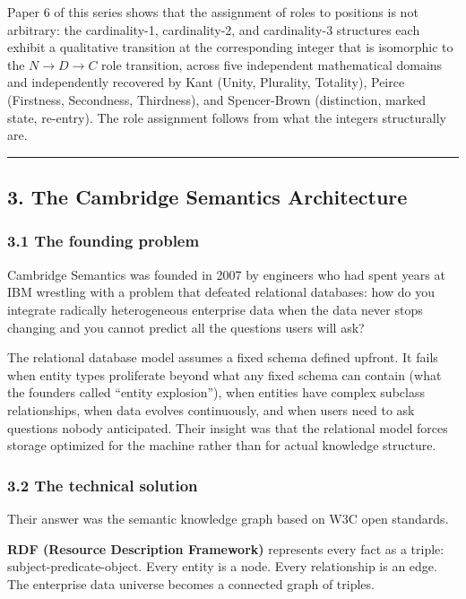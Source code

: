 \documentclass[
  11pt,
  letterpaper,
]{article}
\begin{document}
Paper 6 of this series shows that the assignment of roles to positions
is not arbitrary: the cardinality-1, cardinality-2, and cardinality-3
structures each exhibit a qualitative transition at the corresponding
integer that is isomorphic to the \(N \to D \to C\) role transition,
across five independent mathematical domains and independently recovered
by Kant (Unity, Plurality, Totality), Peirce (Firstness, Secondness,
Thirdness), and Spencer-Brown (distinction, marked state, re-entry). The
role assignment follows from what the integers structurally are.

\begin{center}\rule{0.5\linewidth}{0.5pt}\end{center}

\subsection{3. The Cambridge Semantics
Architecture}\label{the-cambridge-semantics-architecture}

\subsubsection{3.1 The founding problem}\label{the-founding-problem}

Cambridge Semantics was founded in 2007 by engineers who had spent years
at IBM wrestling with a problem that defeated relational databases: how
do you integrate radically heterogeneous enterprise data when the data
never stops changing and you cannot predict all the questions users will
ask?

The relational database model assumes a fixed schema defined upfront. It
fails when entity types proliferate beyond what any fixed schema can
contain (what the founders called ``entity explosion''), when entities
have complex subclass relationships, when data evolves continuously, and
when users need to ask questions nobody anticipated. Their insight was
that the relational model forces storage optimized for the machine
rather than for actual knowledge structure.

\subsubsection{3.2 The technical solution}\label{the-technical-solution}

Their answer was the semantic knowledge graph based on W3C open
standards.

\textbf{RDF (Resource Description Framework)} represents every fact as a
triple: subject-predicate-object. Every entity is a node. Every
relationship is an edge. The enterprise data universe becomes a
connected graph of triples.
\end{document}
